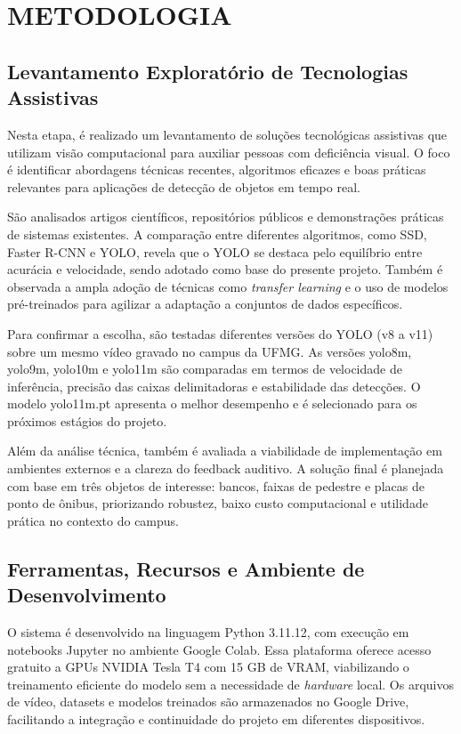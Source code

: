 \chapter{\textbf{METODOLOGIA}}
\section{Levantamento Exploratório de Tecnologias Assistivas}

Nesta etapa, é realizado um levantamento de soluções tecnológicas assistivas que utilizam visão computacional para auxiliar pessoas com deficiência visual. O foco é identificar abordagens técnicas recentes, algoritmos eficazes e boas práticas relevantes para aplicações de detecção de objetos em tempo real.

São analisados artigos científicos, repositórios públicos e demonstrações práticas de sistemas existentes. A comparação entre diferentes algoritmos, como SSD, Faster R-CNN e YOLO, revela que o YOLO se destaca pelo equilíbrio entre acurácia e velocidade, sendo adotado como base do presente projeto. Também é observada a ampla adoção de técnicas como \textit{transfer learning} e o uso de modelos pré-treinados para agilizar a adaptação a conjuntos de dados específicos.

Para confirmar a escolha, são testadas diferentes versões do YOLO (v8 a v11) sobre um mesmo vídeo gravado no campus da UFMG. As versões yolo8m, yolo9m, yolo10m e yolo11m são comparadas em termos de velocidade de inferência, precisão das caixas delimitadoras e estabilidade das detecções. O modelo yolo11m.pt apresenta o melhor desempenho e é selecionado para os próximos estágios do projeto.

Além da análise técnica, também é avaliada a viabilidade de implementação em ambientes externos e a clareza do feedback auditivo. A solução final é planejada com base em três objetos de interesse: bancos, faixas de pedestre e placas de ponto de ônibus, priorizando robustez, baixo custo computacional e utilidade prática no contexto do campus.

\section{Ferramentas, Recursos e Ambiente de Desenvolvimento}

O sistema é desenvolvido na linguagem Python 3.11.12, com execução em notebooks Jupyter no ambiente Google Colab. Essa plataforma oferece acesso gratuito a GPUs NVIDIA Tesla T4 com 15 GB de VRAM, viabilizando o treinamento eficiente do modelo sem a necessidade de \textit{hardware} local. Os arquivos de vídeo, datasets e modelos treinados são armazenados no Google Drive, facilitando a integração e continuidade do projeto em diferentes dispositivos.

